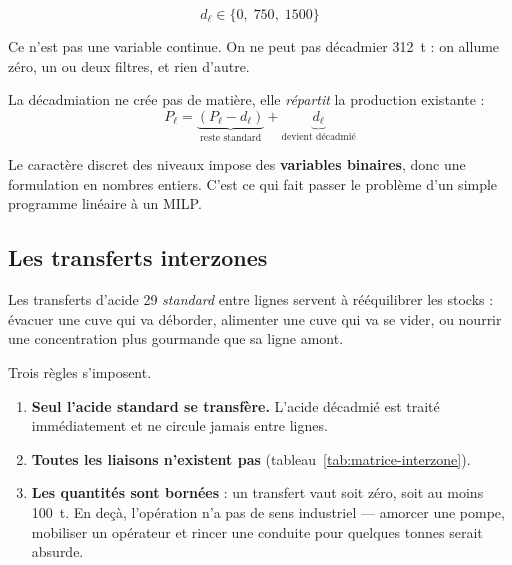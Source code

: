 \begin{equation}
d_\ell \in \{0,\; 750,\; 1500\}
\label{eq:niveaux-decad}
\end{equation}

Ce n'est pas une variable continue. On ne peut pas décadmier \SI{312}{\tonne} : on allume
zéro, un ou deux filtres, et rien d'autre.

La décadmiation ne crée pas de matière, elle \emph{répartit} la production existante :
\begin{equation}
P_\ell = \underbrace{(P_\ell - d_\ell)}_{\text{reste standard}} + \underbrace{d_\ell}_{\text{devient décadmié}}
\end{equation}

\begin{encadre}[title={Conséquence pour le modèle}]
Le caractère discret des niveaux impose des \textbf{variables binaires}, donc une
formulation en nombres entiers. C'est ce qui fait passer le problème d'un simple programme
linéaire à un MILP.
\end{encadre}

\subsection{Les transferts interzones}

Les transferts d'acide 29 \emph{standard} entre lignes servent à rééquilibrer les stocks :
évacuer une cuve qui va déborder, alimenter une cuve qui va se vider, ou nourrir une
concentration plus gourmande que sa ligne amont.

Trois règles s'imposent.

\begin{enumerate}
  \item \textbf{Seul l'acide standard se transfère.} L'acide décadmié est traité
        immédiatement et ne circule jamais entre lignes.
  \item \textbf{Toutes les liaisons n'existent pas} (tableau~\ref{tab:matrice-interzone}).
  \item \textbf{Les quantités sont bornées} : un transfert vaut soit zéro, soit au moins
        \SI{100}{\tonne}. En deçà, l'opération n'a pas de sens industriel --- amorcer une
        pompe, mobiliser un opérateur et rincer une conduite pour quelques tonnes serait
        absurde.
\end{enumerate}


